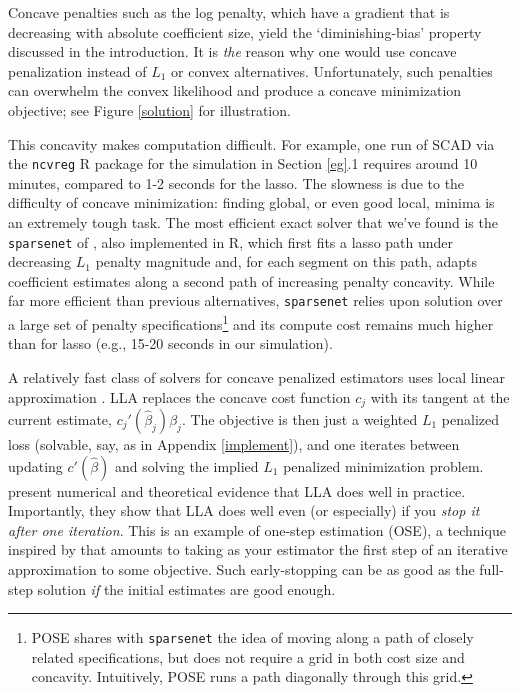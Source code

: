 \documentclass[twoside]{article}
\begin{document}
Concave penalties such as the log penalty, which have a gradient that is
decreasing with absolute coefficient size,  yield the `diminishing-bias'
property discussed in the introduction. It is {\it the} reason why one would
use concave penalization instead of $L_1$ or convex alternatives.
Unfortunately, such penalties can overwhelm the convex likelihood and produce a 
concave minimization objective; see Figure \ref{solution} for illustration.


This concavity makes computation difficult.  For example,  one run of SCAD via
the \texttt{ncvreg} R package \citep{breheny_coordinate_2011} for the
simulation in Section \ref{eg}.1 requires around 10 minutes, compared to 1-2
seconds for the lasso.  The slowness is due to the difficulty of concave
minimization: finding global, or even good local, minima is an extremely tough
task.  The most efficient exact solver that we've found is the
\texttt{sparsenet} of \citet{mazumder_sparsenet_2011}, also implemented in R,
which first fits a lasso path under decreasing $L_1$ penalty magnitude and,
for each segment on this path, adapts coefficient estimates along a second
path of increasing penalty concavity. While far more efficient than previous
alternatives, \texttt{sparsenet}  relies upon solution over a large set of
penalty specifications\footnote{POSE shares with
\texttt{sparsenet} the idea of moving along a path of closely related
specifications, but does not require a grid in both  cost size and concavity.
Intuitively,  POSE runs  a path diagonally through this grid.}  
 and its compute cost remains much higher than for lasso
(e.g., 15-20 seconds in our simulation).

A relatively fast class of solvers for concave penalized estimators uses
local linear approximation \cite[LLA; e.g.,][]{candes_enhancing_2008}. LLA
replaces the concave cost function $c_j$  with its tangent at the current
estimate, $c_j'(\hat\beta_j)\beta_j$.  The objective is then just a weighted
$L_1$ penalized loss (solvable, say, as in Appendix \ref{implement}), and one
iterates between updating $c'(\hat\beta)$ and solving the implied $L_1$
penalized minimization problem.  \citet{zou_one-step_2008} present numerical
and theoretical evidence that  LLA does well in practice. Importantly, they
show that LLA does well even (or especially) if you {\it stop it after one
iteration}. This is an example of one-step estimation (OSE), a 
technique inspired by \cite{bickel_one-step_1975} that amounts to taking as
your estimator the first step of an iterative approximation to some objective.
Such early-stopping can be as good  as the full-step solution
{\it if} the initial estimates are good enough. 
\end{document}
